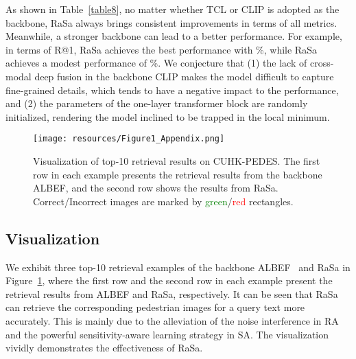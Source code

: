 \documentclass{article}
\begin{document}
As shown in Table~\ref{table8}, no matter whether TCL or CLIP is adopted as the backbone, RaSa always brings consistent improvements in terms of all metrics.
Meanwhile, a stronger backbone can lead to a better performance.
For example, in terms of R@1, RaSa achieves the best performance with \%,
while RaSa achieves a modest performance of \%.
We conjecture that (1) the lack of cross-modal deep fusion in the backbone CLIP makes the model difficult to capture fine-grained details, which tends to have a negative impact to the performance, and (2) the parameters of the one-layer transformer block are randomly initialized, rendering the model inclined to be trapped in the local minimum.



\begin{figure}[t]
\centering
\texttt{[image: resources/Figure1\_Appendix.png]} \caption{Visualization of top-10 retrieval results on CUHK-PEDES.
The first row in each example presents the retrieval results from the backbone ALBEF, and the second row shows the results from RaSa.
Correct/Incorrect images are marked by \textcolor{green}{green}/\textcolor{red}{red} rectangles.}
\label{fig5}
\end{figure}


\subsection{Visualization}
\label{visualization}
We exhibit three top-10 retrieval examples of the backbone ALBEF~\cite{NEURIPS2021_50525975} and RaSa in Figure~\ref{fig5}, where the first row and the second row in each example present the retrieval results from ALBEF and RaSa, respectively.
It can be seen that RaSa can retrieve the corresponding pedestrian images for a query text more accurately. 
This is mainly due to the alleviation of the noise interference in RA and the powerful sensitivity-aware learning strategy in SA.
The visualization vividly demonstrates the effectiveness of RaSa. 
\end{document}
